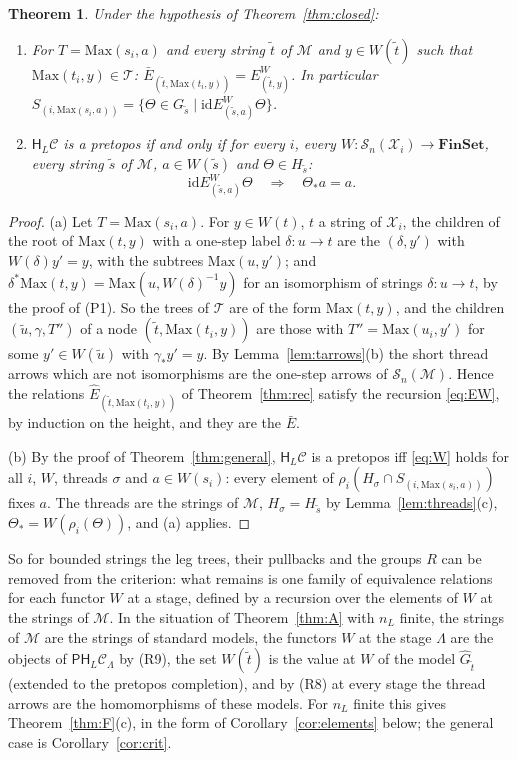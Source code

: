 \documentclass[11pt]{amsart}
\newtheorem{thm}{Theorem}[section]
\theoremstyle{definition}
\newcommand{\Fin}{\mathbf{FinSet}}
\newcommand{\Max}{\mathrm{Max}}
\newcommand{\PP}{\mathsf P}
\newcommand{\HH}{\mathsf H}
\newcommand{\cX}{\mathcal X}
\newcommand{\cC}{\mathcal C}
\newcommand{\cM}{\mathcal M}
\newcommand{\cS}{\mathcal S}
\newcommand{\id}{\mathrm{id}}
\begin{document}
\begin{thm}\label{thm:elements}
Under the hypothesis of Theorem~\ref{thm:closed}:
\begin{enumerate}
\item[(a)] For $T=\Max(s_i,a)$ and every string $\tilde t$ of $\cM$
and $y\in W(\tilde t)$ such that $\Max(t_i,y)\in\mathcal T$:
$\bar E_{(\tilde t,\Max(t_i,y))}=E^W_{(\tilde t,y)}$. In particular
$S_{(i,\Max(s_i,a))}=\{\Theta\in G_{\tilde s}\mid\id\mathrel{
E^W_{(\tilde s,a)}}\Theta\}$.
\item[(b)] $\HH_L\cC$ is a pretopos if and only if for every $i$,
every $W\colon\cS_n(\cX_i)\to\Fin$, every string $\tilde s$ of $\cM$,
$a\in W(\tilde s)$ and $\Theta\in H_{\tilde s}$:
\[
\id\mathrel{E^W_{(\tilde s,a)}}\Theta\quad\Longrightarrow\quad
\Theta_*a=a .
\]
\end{enumerate}
\end{thm}
\begin{proof}
(a) Let $T=\Max(s_i,a)$. For $y\in W(t)$, $t$ a string of $\cX_i$,
the children of the root of $\Max(t,y)$ with a one-step label
$\delta\colon u\to t$ are the $(\delta,y')$ with $W(\delta)y'=y$,
with the subtrees $\Max(u,y')$; and $\delta^*\Max(t,y)=\Max(u,
W(\delta)^{-1}y)$ for an isomorphism of strings $\delta\colon u\to
t$, by the proof of (P1). So the trees of $\mathcal T$ are of the
form $\Max(t,y)$, and the children $(\tilde u,\gamma,T'')$ of a node
$(\tilde t,\Max(t_i,y))$ are those with $T''=\Max(u_i,y')$ for some
$y'\in W(\tilde u)$ with $\gamma_*y'=y$. By
Lemma~\ref{lem:tarrows}(b) the short thread arrows which are not
isomorphisms are the one-step arrows of $\cS_n(\cM)$. Hence the
relations $\widehat E_{(\tilde t,\Max(t_i,y))}$ of
Theorem~\ref{thm:rec} satisfy the recursion \eqref{eq:EW}, by
induction on the height, and they are the $\bar E$.

(b) By the proof of Theorem~\ref{thm:general}, $\HH_L\cC$ is a
pretopos iff \eqref{eq:W} holds for all $i$, $W$, threads $\sigma$ and
$a\in W(s_i)$: every element of $\rho_i(H_\sigma\cap
S_{(i,\Max(s_i,a))})$ fixes $a$. The threads are the strings of
$\cM$, $H_\sigma=H_{\tilde s}$ by Lemma~\ref{lem:threads}(c),
$\Theta_*=W(\rho_i(\Theta))$, and (a) applies.
\end{proof}

So for bounded strings the leg trees, their pullbacks and the groups
$R$ can be removed from the criterion: what remains is one family of
equivalence relations for each functor $W$ at a stage, defined by a
recursion over the elements of $W$ at the strings of $\cM$. In the
situation of Theorem~\ref{thm:A} with $n_L$ finite, the strings of
$\cM$ are the strings of standard models, the functors $W$ at the
stage $\Lambda$ are the objects of $\PP\HH_L\cC_\Lambda$ by (R9), the
set $W(\tilde t)$ is the value at $W$ of the model $\hat G_{\tilde t}$
(extended to the pretopos completion), and by (R8) at every stage the
thread arrows are the homomorphisms of these models. For $n_L$ finite
this gives Theorem~\ref{thm:F}(c), in the form of
Corollary~\ref{cor:elements} below; the general case is
Corollary~\ref{cor:crit}.
\end{document}
